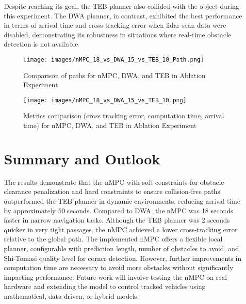 \documentclass[conference]{IEEEtran}
\begin{document}
Despite reaching its goal, the TEB planner also collided with the object during this experiment. The DWA planner, in contrast, exhibited the best performance in terms of arrival time and cross tracking error when lidar scan data were disabled, demonstrating its robustness in situations where real-time obstacle detection is not available.

\begin{figure}[!h]
    \centering
    \texttt{[image: images/nMPC\_18\_vs\_DWA\_15\_vs\_TEB\_10\_Path.png]}
    \caption{Comparison of paths for nMPC, DWA, and TEB in Ablation Experiment}
    \label{fig:nMPC_16_vs_DWA_12_vs_TEB_6_Path}
\end{figure}

\begin{figure}[!h]
    \centering
    \texttt{[image: images/nMPC\_18\_vs\_DWA\_15\_vs\_TEB\_10.png]}
    \caption{Metrics comparison (cross tracking error, computation time, arrival time) for nMPC, DWA, and TEB in Ablation Experiment}
    \label{fig:nMPC_16_vs_DWA_12_vs_TEB_6}
\end{figure}


\section{Summary and Outlook}

The results demonstrate that the nMPC with soft constraints for obstacle clearance penalization and hard constraints to ensure collision-free paths outperformed the TEB planner in dynamic environments, reducing arrival time by approximately 50 seconds. Compared to DWA, the nMPC was 18 seconds faster in narrow navigation tasks. Although the TEB planner was 2 seconds quicker in very tight passages, the nMPC achieved a lower cross-tracking error relative to the global path. The implemented nMPC offers a flexible local planner, configurable with prediction length, number of obstacles to avoid, and Shi-Tomasi quality level for corner detection. However, further improvements in computation time are necessary to avoid more obstacles without significantly impacting performance. Future work will involve testing the nMPC on real hardware and extending the model to control tracked vehicles using mathematical, data-driven, or hybrid models.

{\small


}


\clearpage 
\end{document}
